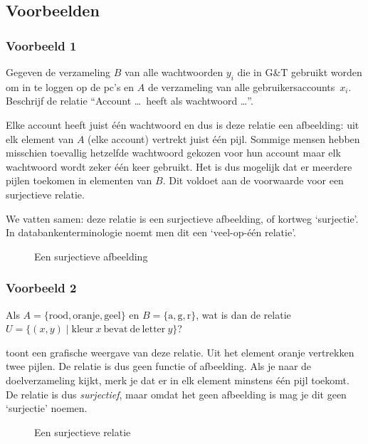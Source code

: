 \subsection{Voorbeelden}
\subsubsection*{Voorbeeld 1}
Gegeven de verzameling $B$ van alle wachtwoorden $y_i$ die in G\&T gebruikt worden om in te loggen op de pc's en $A$ de verzameling van alle ge\-brui\-kers\-accounts~$x_i$. Beschrijf de relatie ``Account \ldots \ heeft als wachtwoord \ldots ''.

Elke account heeft juist één wachtwoord en dus is deze relatie een afbeelding: uit elk element van $A$ (elke account) vertrekt juist één pijl.
Sommige mensen hebben misschien toevallig hetzelfde wachtwoord gekozen voor hun account maar elk wachtwoord wordt zeker één keer gebruikt. Het is dus mogelijk dat er meerdere pijlen toekomen in elementen van $B$. Dit voldoet aan de voorwaarde voor een surjectieve relatie.

We vatten samen: deze relatie is een surjectieve afbeelding, of kortweg `surjectie'. In databankenterminologie noemt men dit een `veel-op-één relatie'.
\begin{figure}[htbp]
\centering
    
\caption{Een surjectieve afbeelding}
\label{fig:surjectie}
\end{figure}


\subsubsection*{Voorbeeld 2}
Als $A=\{\mathrm{rood},\mathrm{oranje},\mathrm{geel}\}$ en $B=\{\mathrm{a},\mathrm{g},\mathrm{r}\}$, wat is dan de relatie $U=\{({x},{y})\mid \mathrm{kleur~}x\mathrm{~bevat~de~letter~}y\}$?

 toont een grafische weergave van deze relatie. Uit het element oranje vertrekken twee pijlen. De relatie is dus geen functie of afbeelding. Als je naar de doelverzameling kijkt, merk je dat er in elk element minstens één pijl toekomt. De relatie is dus \emph{surjectief}, maar omdat het geen afbeelding is mag je dit geen  `surjectie' noemen.
\begin{figure}[htbp]
\centering
    
\caption{Een surjectieve relatie}
\label{fig:surjectieverel}
\end{figure}


